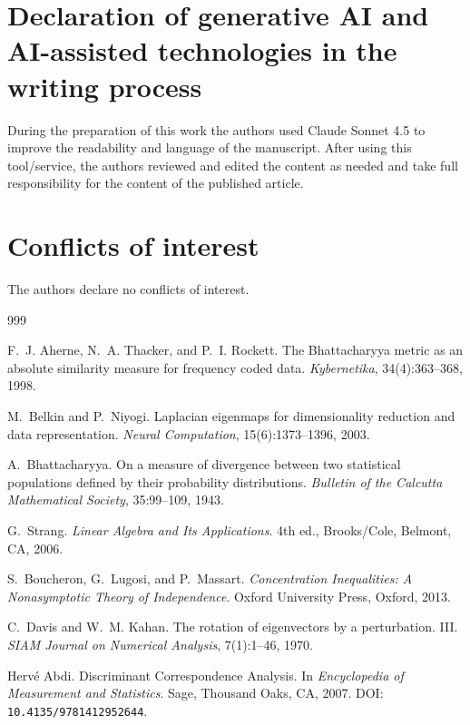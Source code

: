 \documentclass[preprint,11pt]{elsarticle}
\begin{document}
\section*{Declaration of generative AI and AI-assisted technologies in the writing process} 
During the preparation of this work the authors used Claude Sonnet 4.5 to improve the readability and language of the manuscript. After using this tool/service, the authors reviewed and edited the content as needed and take full responsibility for the content of the published article.


\section*{Conflicts of interest}
The authors declare no conflicts of interest.

\begin{thebibliography}{999} %

F.~J. Aherne, N.~A. Thacker, and P.~I. Rockett.
\newblock The {Bhattacharyya} metric as an absolute similarity measure for frequency coded data.
\newblock \emph{Kybernetika}, 34(4):363--368, 1998.

M.~Belkin and P.~Niyogi.
\newblock Laplacian eigenmaps for dimensionality reduction and data representation.
\newblock \emph{Neural Computation}, 15(6):1373--1396, 2003.

A.~Bhattacharyya.
\newblock On a measure of divergence between two statistical populations defined by their probability distributions.
\newblock \emph{Bulletin of the Calcutta Mathematical Society}, 35:99--109, 1943.

G.~Strang.
\newblock \emph{Linear Algebra and Its Applications}.
\newblock 4th ed., Brooks/Cole, Belmont, CA, 2006.

S.~Boucheron, G.~Lugosi, and P.~Massart.
\newblock \emph{Concentration Inequalities: A Nonasymptotic Theory of Independence}.
\newblock Oxford University Press, Oxford, 2013.

C.~Davis and W.~M. Kahan.
\newblock The rotation of eigenvectors by a perturbation. {III}.
\newblock \emph{SIAM Journal on Numerical Analysis}, 7(1):1--46, 1970.

Hervé Abdi.
\newblock Discriminant Correspondence Analysis.
\newblock In \emph{Encyclopedia of Measurement and Statistics}.
\newblock Sage, Thousand Oaks, CA, 2007.
\newblock DOI: \texttt{10.4135/9781412952644}.


\end{thebibliography}
\end{document}

